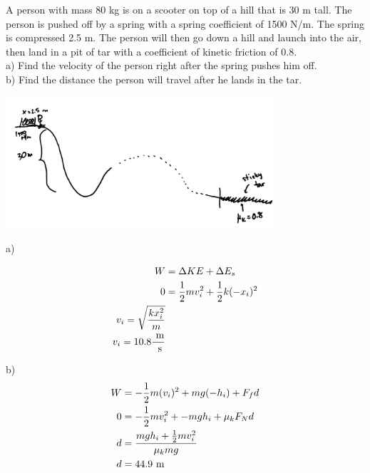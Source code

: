 \begin{problem}
    A person with mass 80 kg is on a scooter on top of a hill that is 30 m tall. The person is pushed off by a spring with a spring coefficient of 1500 N/m. The spring is compressed 2.5 m. The person will then go down a hill and launch into the air, then land in a pit of tar with a coefficient of kinetic friction of 0.8. \\

    a) Find the velocity of the person right after the spring pushes him off.\\

    b) Find the distance the person will travel after he lands in the tar. 

    \begin{center}
        \includegraphics[width=0.75\textwidth]{chapters/ch4/images/fig4_10.PNG}
    \end{center}

    a)

    $$
    \begin{aligned}
        W &= \Delta KE + \Delta E_s\\
        0 &= \frac{1}{2}mv_i^2+\frac{1}{2}k(-x_i)^2\\
        v_i = \sqrt{\frac{kx_i^2}{m}}\\
        v_i = 10.8 \frac{\text{ m}}{\text{ s}}
    \end{aligned}
    $$

    b)
    $$
    \begin{aligned}
        W &= -\frac{1}{2}m(v_i)^2 + mg(-h_i) + F_fd\\
        0 &= -\frac{1}{2}mv_i^2 + - mgh_i + \mu_kF_Nd\\
        d &= \frac{mgh_i + \frac{1}{2}mv_i^2}{\mu_kmg}\\
        d &= 44.9 \text{ m}
    \end{aligned}
    $$
\end{problem}


